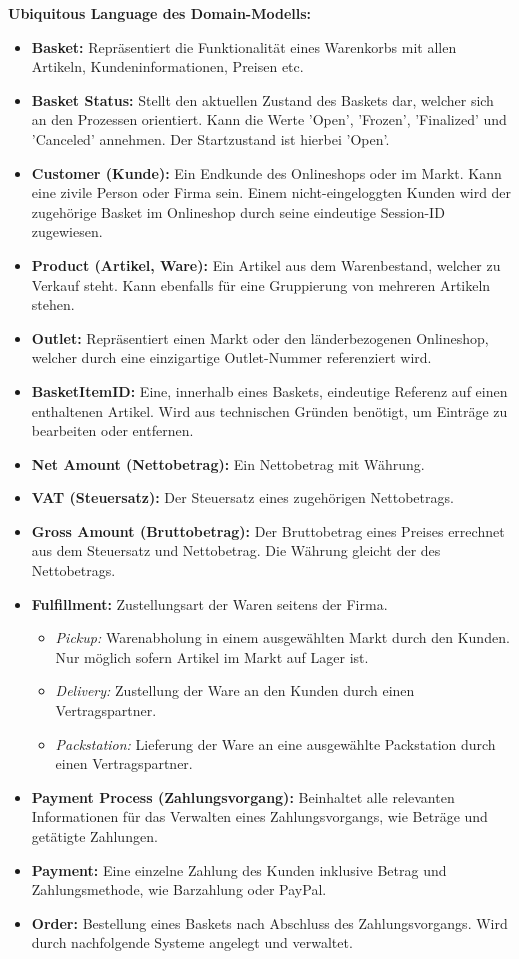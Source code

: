 {\large \textbf{Ubiquitous Language des Domain-Modells:}}
\begin{itemize}[topsep=-3px]
	\item \textbf{Basket: } {Repräsentiert die Funktionalität eines Warenkorbs mit allen Artikeln, Kundeninformationen, Preisen etc.}
	\item \textbf{Basket Status: } {Stellt den aktuellen Zustand des Baskets dar, welcher sich an den Prozessen orientiert. Kann die Werte 'Open', 'Frozen', 'Finalized' und 'Canceled' annehmen. Der Startzustand ist hierbei 'Open'.}
	\item \textbf{Customer (Kunde): } {Ein Endkunde des Onlineshops oder im Markt. Kann eine zivile Person oder Firma sein. Einem nicht-eingeloggten Kunden wird der zugehörige Basket im Onlineshop durch seine eindeutige Session-ID zugewiesen.} 
	\item \textbf{Product (Artikel, Ware): } {Ein Artikel aus dem Warenbestand, welcher zu Verkauf steht. Kann ebenfalls für eine Gruppierung von mehreren Artikeln stehen.}
	\item \textbf{Outlet: } {Repräsentiert einen Markt oder den länderbezogenen Onlineshop, welcher durch eine einzigartige Outlet-Nummer referenziert wird.}
	\item \textbf{BasketItemID: } {Eine, innerhalb eines Baskets, eindeutige Referenz auf einen enthaltenen Artikel. Wird aus technischen Gründen benötigt, um Einträge zu bearbeiten oder entfernen.}
	\item \textbf{Net Amount (Nettobetrag): } {Ein Nettobetrag mit Währung.}
	\item \textbf{VAT (Steuersatz): } {Der Steuersatz eines zugehörigen Nettobetrags.}
	\item \textbf{Gross Amount (Bruttobetrag): } {Der Bruttobetrag eines Preises errechnet aus dem Steuersatz und Nettobetrag. Die Währung gleicht der des Nettobetrags.}
	\item \textbf{Fulfillment: } {Zustellungsart der Waren seitens der Firma.}
	\begin{itemize}[noitemsep,nolistsep, topsep=-5px]
		\item \textit{Pickup: } {Warenabholung in einem ausgewählten Markt durch den Kunden. Nur möglich sofern Artikel im Markt auf Lager ist.}
		\item \textit{Delivery: } {Zustellung der Ware an den Kunden durch einen Vertragspartner.}
		\item \textit{Packstation: } {Lieferung der Ware an eine ausgewählte Packstation durch einen Vertragspartner.}
	\end{itemize}
	\item \textbf{Payment Process (Zahlungsvorgang): } {Beinhaltet alle relevanten Informationen für das Verwalten eines Zahlungsvorgangs, wie Beträge und getätigte Zahlungen.}
	\item \textbf{Payment: } {Eine einzelne Zahlung des Kunden inklusive Betrag und Zahlungsmethode, wie Barzahlung oder PayPal.}
	\item \textbf{Order: } {Bestellung eines Baskets nach Abschluss des Zahlungsvorgangs. Wird durch nachfolgende Systeme angelegt und verwaltet.}
\end{itemize}

